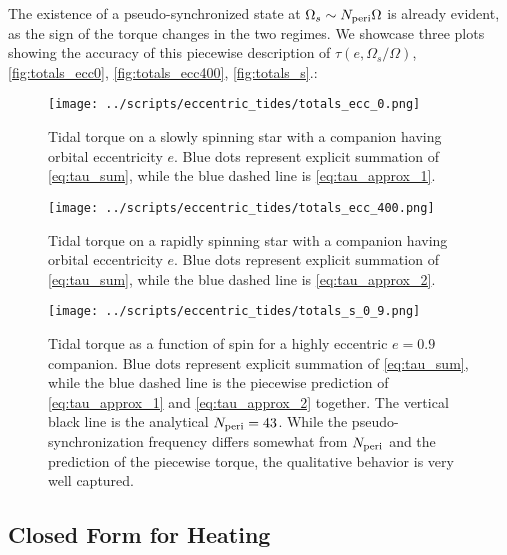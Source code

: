 \documentclass[
        fleqn,
        usenatbib,
        referee,
    ]{mnras}
\newcommand*{\p}[1]{\left(#1\right)}
\begin{document}
The existence of a pseudo-synchronized state at $\Omega_s \sim N_{\rm peri}
\Omega$ is already evident, as the sign of the torque changes in the two
regimes. We showcase three plots showing the accuracy of this piecewise
description of $\tau\p{e, \Omega_s / \Omega}$, \autoref{fig:totals_ecc0},
\autoref{fig:totals_ecc400}, \autoref{fig:totals_s}.:
\begin{figure}
    \centering
    \texttt{[image: ../scripts/eccentric\_tides/totals\_ecc\_0.png]}
    \caption{Tidal torque on a slowly spinning star with a companion having
    orbital eccentricity $e$. Blue dots represent explicit summation of
    \autoref{eq:tau_sum}, while the blue dashed line is
    \autoref{eq:tau_approx_1}.}\label{fig:totals_ecc0}
\end{figure}
\begin{figure}
    \centering
    \texttt{[image: ../scripts/eccentric\_tides/totals\_ecc\_400.png]}
    \caption{Tidal torque on a rapidly spinning star with a companion having
    orbital eccentricity $e$. Blue dots represent explicit summation of
    \autoref{eq:tau_sum}, while the blue dashed line is
    \autoref{eq:tau_approx_2}.}\label{fig:totals_ecc400}
\end{figure}
\begin{figure}
    \centering
    \texttt{[image: ../scripts/eccentric\_tides/totals\_s\_0\_9.png]}
    \caption{Tidal torque as a function of spin for a highly eccentric $e = 0.9$
    companion. Blue dots represent explicit summation of \autoref{eq:tau_sum},
    while the blue dashed line is the piecewise prediction of
    \autoref{eq:tau_approx_1} and \autoref{eq:tau_approx_2} together. The
    vertical black line is the analytical $N_{\rm peri} = 43$. While the
    pseudo-synchronization frequency differs somewhat from $N_{\rm peri}$ and
    the prediction of the piecewise torque, the qualitative behavior is very
    well captured.}\label{fig:totals_s}
\end{figure}

\subsection{Closed Form for Heating}
\end{document}
